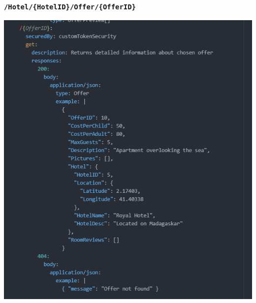 \documentclass{article}
\begin{document}
\subsubsection{\texttt{/Hotel/\{HotelID\}/Offer/\{OfferID\}}}
\includegraphics[width=\linewidth]{Oferta+Hotel-Raml/OfferID_Raml.png}
\newpage
\end{document}
